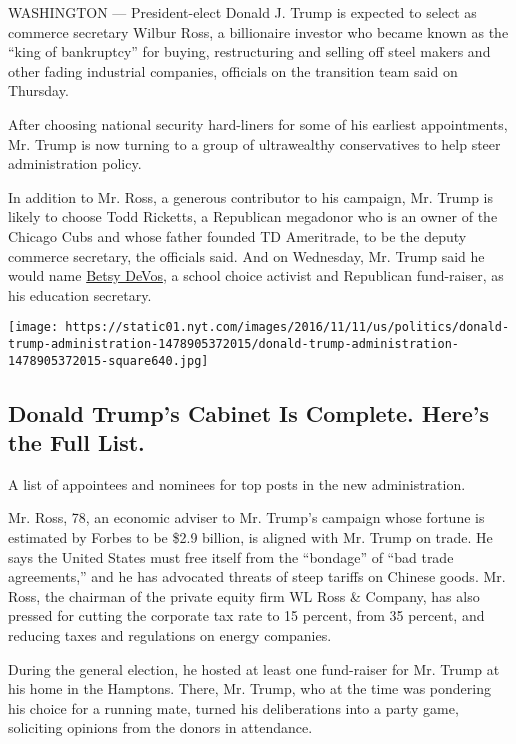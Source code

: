 WASHINGTON --- President-elect Donald J. Trump is expected to select as
commerce secretary Wilbur Ross, a billionaire investor who became known
as the ``king of bankruptcy'' for buying, restructuring and selling off
steel makers and other fading industrial companies, officials on the
transition team said on Thursday.

After choosing national security hard-liners for some of his earliest
appointments, Mr. Trump is now turning to a group of ultrawealthy
conservatives to help steer administration policy.

In addition to Mr. Ross, a generous contributor to his campaign, Mr.
Trump is likely to choose Todd Ricketts, a Republican megadonor who is
an owner of the Chicago Cubs and whose father founded TD Ameritrade, to
be the deputy commerce secretary, the officials said. And on Wednesday,
Mr. Trump said he would name
\href{http://www.nytimes.com/2016/11/23/us/politics/betsy-devos-trumps-education-pick-has-steered-money-from-public-schools.html}{Betsy
DeVos}, a school choice activist and Republican fund-raiser, as his
education secretary.

\href{https://www.nytimes.com/interactive/2016/us/politics/donald-trump-administration.html}{}

\texttt{[image: https://static01.nyt.com/images/2016/11/11/us/politics/donald-trump-administration-1478905372015/donald-trump-administration-1478905372015-square640.jpg]}

\hypertarget{donald-trumps-cabinet-is-complete-heres-the-full-list}{%
\subsection{Donald Trump's Cabinet Is Complete. Here's the Full
List.}\label{donald-trumps-cabinet-is-complete-heres-the-full-list}}

A list of appointees and nominees for top posts in the new
administration.

Mr. Ross, 78, an economic adviser to Mr. Trump's campaign whose fortune
is estimated by Forbes to be \$2.9 billion, is aligned with Mr. Trump on
trade. He says the United States must free itself from the ``bondage''
of ``bad trade agreements,'' and he has advocated threats of steep
tariffs on Chinese goods. Mr. Ross, the chairman of the private equity
firm WL Ross \& Company, has also pressed for cutting the corporate tax
rate to 15 percent, from 35 percent, and reducing taxes and regulations
on energy companies.

During the general election, he hosted at least one fund-raiser for Mr.
Trump at his home in the Hamptons. There, Mr. Trump, who at the time was
pondering his choice for a running mate, turned his deliberations into a
party game, soliciting opinions from the donors in attendance.


